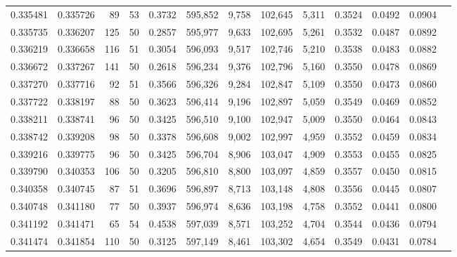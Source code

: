 \begin{tabular}{rrrrrrrrrrrrr}
0.335481 & 0.335726 &    89 &  53 &                                     0.3732 & 595,852 &   9,758 & 102,645 &   5,311 & 0.3524 & 0.0492 & 0.0904 \\
0.335735 & 0.336207 &   125 &  50 &                                     0.2857 & 595,977 &   9,633 & 102,695 &   5,261 & 0.3532 & 0.0487 & 0.0892 \\
0.336219 & 0.336658 &   116 &  51 &                                     0.3054 & 596,093 &   9,517 & 102,746 &   5,210 & 0.3538 & 0.0483 & 0.0882 \\
0.336672 & 0.337267 &   141 &  50 &                                     0.2618 & 596,234 &   9,376 & 102,796 &   5,160 & 0.3550 & 0.0478 & 0.0869 \\
0.337270 & 0.337716 &    92 &  51 &                                     0.3566 & 596,326 &   9,284 & 102,847 &   5,109 & 0.3550 & 0.0473 & 0.0860 \\
0.337722 & 0.338197 &    88 &  50 &                                     0.3623 & 596,414 &   9,196 & 102,897 &   5,059 & 0.3549 & 0.0469 & 0.0852 \\
0.338211 & 0.338741 &    96 &  50 &                                     0.3425 & 596,510 &   9,100 & 102,947 &   5,009 & 0.3550 & 0.0464 & 0.0843 \\
0.338742 & 0.339208 &    98 &  50 &                                     0.3378 & 596,608 &   9,002 & 102,997 &   4,959 & 0.3552 & 0.0459 & 0.0834 \\
0.339216 & 0.339775 &    96 &  50 &                                     0.3425 & 596,704 &   8,906 & 103,047 &   4,909 & 0.3553 & 0.0455 & 0.0825 \\
0.339790 & 0.340353 &   106 &  50 &                                     0.3205 & 596,810 &   8,800 & 103,097 &   4,859 & 0.3557 & 0.0450 & 0.0815 \\
0.340358 & 0.340745 &    87 &  51 &                                     0.3696 & 596,897 &   8,713 & 103,148 &   4,808 & 0.3556 & 0.0445 & 0.0807 \\
0.340748 & 0.341180 &    77 &  50 &                                     0.3937 & 596,974 &   8,636 & 103,198 &   4,758 & 0.3552 & 0.0441 & 0.0800 \\
0.341192 & 0.341471 &    65 &  54 &                                     0.4538 & 597,039 &   8,571 & 103,252 &   4,704 & 0.3544 & 0.0436 & 0.0794 \\
0.341474 & 0.341854 &   110 &  50 &                                     0.3125 & 597,149 &   8,461 & 103,302 &   4,654 & 0.3549 & 0.0431 & 0.0784 \\

\end{tabular}
